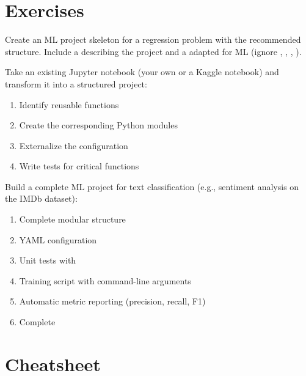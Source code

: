 \section{Exercises}
\label{sec:exercises-ch1}

\begin{exercise}
Create an ML project skeleton for a regression problem with the recommended
structure. Include a  describing the project and a
 adapted for ML (ignore , ,
, ).
\end{exercise}

\begin{exercise}
Take an existing Jupyter notebook (your own or a Kaggle notebook) and
transform it into a structured project:
\begin{enumerate}
  \item Identify reusable functions
  \item Create the corresponding Python modules
  \item Externalize the configuration
  \item Write tests for critical functions
\end{enumerate}
\end{exercise}

\begin{exercise}
Build a complete ML project for text classification (e.g., sentiment
analysis on the IMDb dataset):
\begin{enumerate}
  \item Complete modular structure
  \item YAML configuration
  \item Unit tests with 
  \item Training script with command-line arguments
  \item Automatic metric reporting (precision, recall, F1)
  \item Complete 
\end{enumerate}
\end{exercise}

\section{Cheatsheet}

